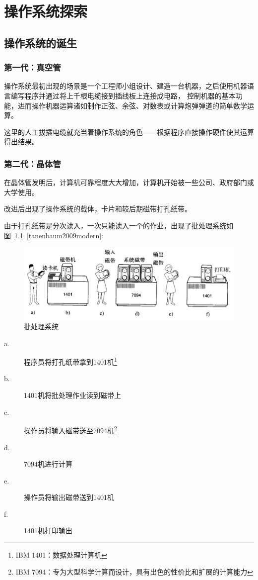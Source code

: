 \chapter{操作系统探索}

\section{操作系统的诞生}

\subsection{第一代：真空管}

操作系统最初出现的场景是一个工程师小组设计、建造一台机器，之后使用机器语言编写程序并通过将上千根电缆接到插线板上连接成电路，
控制机器的基本功能，进而操作机器运算诸如制作正弦、余弦、对数表或计算炮弹弹道的简单数学运算。

这里的人工拔插电缆就充当着操作系统的角色——根据程序直接操作硬件使其运算得出结果。

\subsection{第二代：晶体管}

在晶体管发明后，计算机可靠程度大大增加，计算机开始被一些公司、政府部门或大学使用。

改进后出现了操作系统的载体，卡片和较后期磁带打孔纸带。

由于打孔纸带是分次读入，一次只能读入一个的作业，出现了批处理系统如图~\ref{fig:btss}~\ref{tanenbaum2009modern}: 

\begin{figure}[h]
  \centering
  \includegraphics[width=.8\textwidth]{fig/btss.png}
  \caption{批处理系统}
  \label{fig:btss}
\end{figure}

\begin{description}
\item[a.]程序员将打孔纸带拿到1401机\footnote{IBM 1401：数据处理计算机\cite{1401dps}}
\item[b.]1401机将批处理作业读到磁带上
\item[c.]操作员将输入磁带送至7094机\footnote{IBM 7094：专为大型科学计算而设计，具有出色的性价比和扩展的计算能力\cite{7094dps}}
\item[d.]7094机进行计算
\item[e.]操作员将输出磁带送到1401机
\item[f.]1401机打印输出
\end{description}


